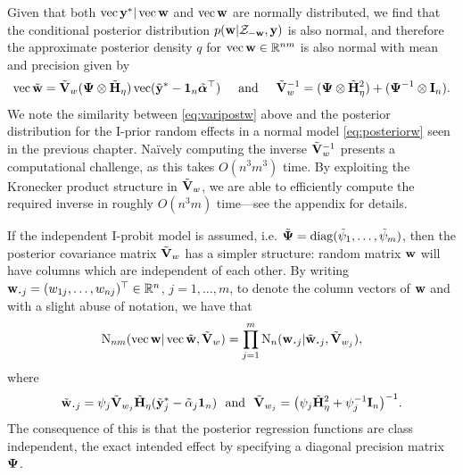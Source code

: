 Given that both $\operatorname{vec} {\mathbf y}^* | \operatorname{vec} {\mathbf w}$ and $\operatorname{vec}{\mathbf w}$ are normally distributed, we find that the conditional posterior distribution $p({\mathbf w}|{\mathcal Z}_{-{\mathbf w}},{\mathbf y})$ is also normal, and therefore the approximate posterior density $q$ for $\operatorname{vec} {\mathbf w} \in \mathbb{R}^{nm}$ is also normal with mean and precision given by
\begin{gather}\label{eq:varipostw}
   \operatorname{vec} \tilde{{\mathbf w}} = \tilde{{\mathbf V}}_w 
    ({\bm\Psi} \otimes \tilde{{\mathbf H}}_\eta) \operatorname{vec} (\tilde{{\mathbf y}}^* - {\mathbf 1}_n\tilde{{\bm\alpha}}^\top)
  \hspace{0.5cm}\text{and}\hspace{0.5cm} 
  \tilde {{\mathbf V}}_w^{-1} = ({\bm\Psi} \otimes \tilde{{\mathbf H}}_\eta^2) + ({\bm\Psi}^{-1} \otimes {\mathbf I}_n).
\end{gather}
We note the similarity between \cref{eq:varipostw} above and the posterior distribution for the I-prior random effects in a normal model \cref{eq:posteriorw} seen in the previous chapter.
Naïvely computing the inverse $\tilde{{\mathbf V}}_w^{-1}$ presents a computational challenge, as this takes $O(n^3m^3)$ time. 
By exploiting the Kronecker product structure in $\tilde{{\mathbf V}}_w$, we are able to efficiently compute the required inverse in roughly $O(n^3m)$ time---see the appendix for details.

If the independent I-probit model is assumed, i.e. $\tilde{{\bm\Psi}} = \operatorname{diag}(\tilde\psi_1,\dots,\tilde\psi_m)$, then the posterior covariance matrix $\tilde{{\mathbf V}}_w$ has a simpler structure:  random matrix ${\mathbf w}$ will have columns which are independent of each other.
By writing $\bw_{\bigcdot j} = (w_{1j},\dots,w_{nj})^\top \in \bbR^n$, $j=1,\dots,m$, to denote the column vectors of ${\mathbf w}$ and with a slight abuse of notation, we have that
\begin{align*}
  \N_{nm}(\vecc \bw|\vecc\wtilde, \tilde\bV_w) 
  = \prod_{j=1}^m \N_{n}(\bw_{\bigcdot j}|\tilde\bw_{\bigcdot j}, \tilde\bV_{w_j}),
\end{align*}
where 
\[
  \tilde \bw_{\bigcdot j} = \psi_j\tilde \bV_{w_j}\tilde\bH_\eta (\tilde\by^*_j - \tilde\alpha_j\bone_n) \ \text{ and } \ \tilde \bV_{w_j} = \big(\psi_j\tilde\bH_{\eta}^2 + \psi_j^{-1}\bI_n \big)^{-1}.
\]
The consequence of this is that the posterior regression functions are class independent, the exact intended effect by specifying a diagonal precision matrix ${\bm\Psi}$.

